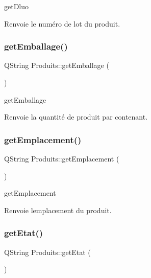get\+Dluo 

\begin{DoxyReturn}{Renvoie}
le numéro de lot du produit. 
\end{DoxyReturn}
\mbox{\label{class_produits_a1f45334c187daa76f7cc89e89165f7d8}} 
\subsubsection{\texorpdfstring{get\+Emballage()}{getEmballage()}}
{\footnotesize\ttfamily Q\+String Produits\+::get\+Emballage (\begin{DoxyParamCaption}{ }\end{DoxyParamCaption})}



get\+Emballage 

\begin{DoxyReturn}{Renvoie}
la quantité de produit par contenant. 
\end{DoxyReturn}
\mbox{\label{class_produits_a7ac80d42336ae2c0ff848546f5a7234b}} 
\subsubsection{\texorpdfstring{get\+Emplacement()}{getEmplacement()}}
{\footnotesize\ttfamily Q\+String Produits\+::get\+Emplacement (\begin{DoxyParamCaption}{ }\end{DoxyParamCaption})}



get\+Emplacement 

\begin{DoxyReturn}{Renvoie}
l\textquotesingle{}emplacement du produit. 
\end{DoxyReturn}
\mbox{\label{class_produits_a999d2dabebf4ad5c3e61a9333b7f78fa}} 
\subsubsection{\texorpdfstring{get\+Etat()}{getEtat()}}
{\footnotesize\ttfamily Q\+String Produits\+::get\+Etat (\begin{DoxyParamCaption}{ }\end{DoxyParamCaption})}



